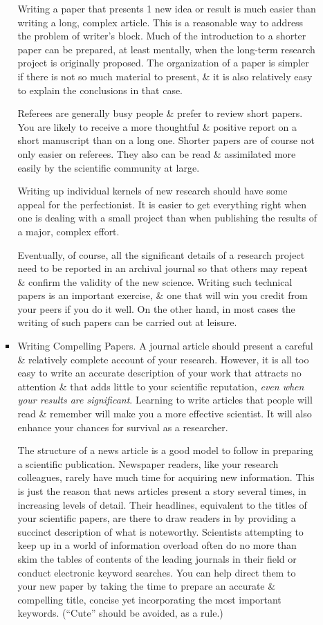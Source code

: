 \documentclass{article}
\begin{document}
\begin{enumerate}
\begin{itemize}
\begin{itemize}
			Writing a paper that presents 1 new idea or result is much easier than writing a long, complex article. This is a reasonable way to address the problem of writer's block. Much of the introduction to a shorter paper can be prepared, at least mentally, when the long-term research project is originally proposed. The organization of a paper is simpler if there is not so much material to present, \& it is also relatively easy to explain the conclusions in that case.
			
			Referees are generally busy people \& prefer to review short papers. You are likely to receive a more thoughtful \& positive report on a short manuscript than on a long one. Shorter papers are of course not only easier on referees. They also can be read \& assimilated more easily by the scientific community at large.
			
			Writing up individual kernels of new research should have some appeal for the perfectionist. It is easier to get everything right when one is dealing with a small project than when publishing the results of a major, complex effort.
			
			Eventually, of course, all the significant details of a research project need to be reported in an archival journal so that others may repeat \& confirm the validity of the new science. Writing such technical papers is an important exercise, \& one that will win you credit from your peers if you do it well. On the other hand, in most cases the writing of such papers can be carried out at leisure.
			\item {\sf Writing Compelling Papers.} A journal article should present a careful \& relatively complete account of your research. However, it is all too easy to write an accurate description of your work that attracts no attention \& that adds little to your scientific reputation, \textit{even when your results are significant}. Learning to write articles that people will read \& remember will make you a more effective scientist. It will also enhance your chances for survival as a researcher.
			
			The structure of a news article is a good model to follow in preparing a scientific publication. Newspaper readers, like your research colleagues, rarely have much time for acquiring new information. This is just the reason that news articles present a story several times, in increasing levels of detail. Their headlines, equivalent to the titles of your scientific papers, are there to draw readers in by providing a succinct description of what is noteworthy. Scientists attempting to keep up in a world of information overload often do no more than skim the tables of contents of the leading journals in their field or conduct electronic keyword searches. You can help direct them to your new paper by taking the time to prepare an accurate \& compelling title, concise yet incorporating the most important keywords. (``Cute'' should be avoided, as a rule.)
			

\end{itemize}
\end{itemize}
\end{enumerate}
\end{document}

